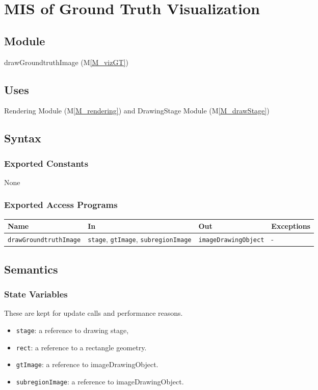 \documentclass[12pt, titlepage]{article}
\newcommand{\mref}[1]{M\ref{#1}}
\newcommand{\mrefp}[1]{(\mref{#1})}
\newcommand{\mreff}[1]{Module \mrefp{#1}}
\newcommand{\code}[1]{\texttt{#1}}
\begin{document}
\newpage


\section{MIS of Ground Truth Visualization} \label{MS_vizGT}

\subsection{Module}
drawGroundtruthImage \mrefp{M_vizGT}

\subsection{Uses}
Rendering \mreff{M_rendering} and DrawingStage \mreff{M_drawStage}

\subsection{Syntax}

\subsubsection{Exported Constants}
None
\subsubsection{Exported Access Programs}

\begin{center}
\begin{tabular}{p{5cm} p{4cm} p{4cm} p{2cm}}
\hline
\textbf{Name} & \textbf{In} & \textbf{Out} & \textbf{Exceptions} \\
\hline
\code{drawGroundtruthImage} & \code{stage}, \code{gtImage}, \code{subregionImage}
  & \code{imageDrawingObject} & - \\
\hline
\end{tabular}
\end{center}

\subsection{Semantics}

\subsubsection{State Variables}
These are kept for update calls and performance reasons.
\begin{itemize}
  \item \code{stage}: a reference to drawing stage,
  \item \code{rect}: a reference to a rectangle geometry.
  \item \code{gtImage}: a reference to imageDrawingObject.
  \item \code{subregionImage}: a reference to imageDrawingObject.
\end{itemize}
\end{document}
